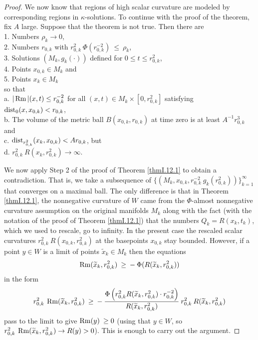 \begin{proof}

We now know that regions of high scalar curvature are modeled by
corresponding
regions in $\kappa$-solutions. To continue with the proof of the theorem,
fix $A$ large.
Suppose that the theorem is not true.  Then there are \\
1. Numbers $\rho_k \rightarrow 0$, \\
2. Numbers $r_{0,k}$ with
$r_{0,k}^{2} \: \Phi(r_{0,k}^{-2}) \: \le \: \rho_k$,
\\
3. Solutions
$(M_k, g_k(\cdot))$ defined for $0 \le t \le r_{0,k}^2$, \\
4. Points $x_{0,k} \in M_k$ and \\
5. Points $x_k \in M_k$\\
so that \\
a. $|\operatorname{Rm}|(x, t) \le r_{0,k}^{-2}$ for
all $(x, t) \in M_k \times [0, r_{0,k}^2]$
satisfying $\operatorname{dist}_0(x, x_{0,k}) < r_{0,k}$, \\
b. The volume of the metric ball $B(x_{0,k}, r_{0,k})$ at
time zero is at least $A^{-1} r_{0,k}^3$ and \\
c.  $\operatorname{dist}_{r_{0,k}^2}(x_k, x_{0,k}) <
A r_{0,k}$, but \\
d. $r_{0,k}^2 \: R(x_k, r_{0,k}^2) \rightarrow \infty$.

We now apply Step 2 of the proof of Theorem \ref{thmI.12.1} to obtain a contradiction.
That is, we take a subsequence of
$\{(M_k, x_{0,k}, r_{0,k}^{-2} \: g_k(r_{0,k}^2))\}_{k=1}^\infty$ that converges on a maximal ball.
The only difference is that in Theorem \ref{thmI.12.1}, the nonnegative curvature
of $W$ came from the $\Phi$-almost nonnegative curvature assumption on the
original manifolds $M_k$ along with the fact (with the notation of the proof of
Theorem \ref{thmI.12.1})
that the numbers $Q_k = R(x_k, t_k)$, which
we used to rescale, go to infinity.
In the present case
the rescaled scalar curvatures $r_{0,k}^2 \: R(x_{0,k}, r_{0,k}^2)$ at the
basepoints $x_{0,k}$
stay bounded.
However, if a point $y \in W$ is a limit of points
$\widetilde{x}_k \in M_k$ then the equations
\begin{equation}
\operatorname{Rm}(\widetilde{x}_k, r_{0,k}^2) \: \ge \: - \: \Phi(R(\widetilde{x}_k, r_{0,k}^2))\end{equation} in the form
\begin{equation}
r_{0,k}^2 \: \operatorname{Rm}(\widetilde{x}_k, r_{0,k}^2) \: \ge \: - \:
\frac{\Phi \left(  r_{0,k}^{2}
R(\widetilde{x}_k, r_{0,k}^2) \cdot r_{0,k}^{-2}
\right)}{ R(\widetilde{x}_k, r_{0,k}^2)} \:
r_{0,k}^2 \: R(\widetilde{x}_k, r_{0,k}^2)
\end{equation}
pass to the limit to give $\operatorname{Rm}(y) \: \ge 0$
(using that $y \in W$, so $r_{0,k}^2 \: \operatorname{Rm}(\widetilde{x}_k, r_{0,k}^2) \rightarrow
R(y) > 0$).
This is enough to carry out the argument.
\end{proof}

